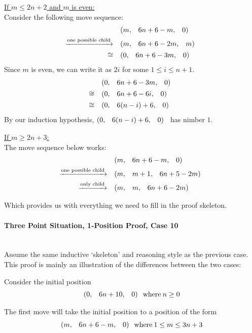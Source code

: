 \documentclass{article}
\makeatletter
\newcommand{\game}[3]{\begin{array}{@{}*6r}(#1, & #2, & #3)\end{array}}
\makeatother
\begin{document}
\bigskip
\underline{If $m \leq 2n + 2$ and $m$ is even:} \\
Consider the following move sequence:
\begin{align*}
  & \game{m}{6n+6-m}{0} \\
  \xrightarrow{\text{one possible child}} \quad & 
  \game{m}{6n+6-2m}{m} \\
  \cong \quad & 
  \game{0}{6n+6-3m}{0} \\
\end{align*}
Since $m$ is even, we can write it as $2i$ for some $1\leq i\leq n+1$.
\begin{align*}
  & \game{0}{6n+6-3m}{0} \\
  \cong \quad & \game{0}{6n+6-6i}{0} \\
  \cong \quad & \game{0}{6(n-i)+6}{0} \\
\end{align*}
By our induction hypothesis, $\game{0}{6(n-i)+6}{0}$ has nimber $1$.

\bigskip
\underline{If $m \geq 2n + 3$:} \\
The move sequence below works:
\begin{align*}
  & \game{m}{6n+6-m}{0} \\
  \xrightarrow{\text{one possible child}} \quad & 
  \game{m}{m+1}{6n+5-2m} \\
  \xrightarrow{\text{only child}} \quad & 
  \game{m}{m}{6n+6-2m} \\
\end{align*}

\bigskip
Which provides us with everything we need to fill in the proof
skeleton.
\newpage

\paragraph{Three Point Situation, 1-Position Proof, Case 10}\mbox{}\\
Assume the same inductive `skeleton' and reasoning style as the previous case.
This proof is mainly an illustration of the differences between the two cases:

\bigskip
Consider the initial position
\begin{equation*}
  \game{0}{6n+10}{0} \: \text{where} \: n \geq 0
\end{equation*}

\medskip
The first move will take the initial position to a position of the form
\begin{equation*}
  \game{m}{6n+6-m}{0} \: \text{where} \: 1 \leq m \leq 3n+3
\end{equation*}
\end{document}
